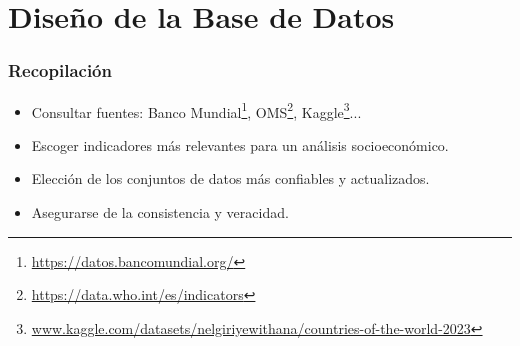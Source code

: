 \documentclass{beamer}
\newcommand{\slideauthor}[1]{\gdef\insertslideauthor{#1}}
\begin{document}
\section{Diseño de la Base de Datos}
\begin{frame}
\frametitle{Recopilación}
\slideauthor{Javier Comyn}
\begin{itemize}
    \item Consultar fuentes: Banco Mundial\footnote{\url{https://datos.bancomundial.org/}}, OMS\footnote{\url{https://data.who.int/es/indicators}}, Kaggle\footnote{\url{www.kaggle.com/datasets/nelgiriyewithana/countries-of-the-world-2023}}...
    \item Escoger indicadores más relevantes para un análisis socioeconómico.
    \item Elección de los conjuntos de datos más confiables y actualizados.
    \item Asegurarse de la consistencia y veracidad.
\end{itemize}
\end{frame}
\end{document}
